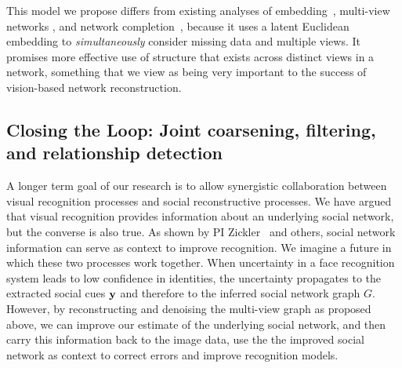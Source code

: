 This model we propose differs from existing analyses of embedding~\cite{Hoff01latentspace,Hancocklatent}, multi-view networks \cite{AiroldiBFX08,Kim12}, and network completion~\cite{Clauset,Guimera,HannekeX09,KimL11}, because it uses a latent Euclidean embedding to \emph{simultaneously} consider missing data and multiple views. It promises more effective use of structure that exists across distinct views in a network, something that we view as being very important to the success of vision-based network reconstruction. 


\subsection{Closing the Loop: Joint coarsening, filtering, and relationship detection}
\label{sec:closeloop}

A longer term goal of our research is to allow synergistic collaboration between visual recognition processes and social reconstructive processes. We have argued that visual recognition provides information about an underlying social network, but the converse is also true. As shown by PI Zickler~\cite{Stone2008,Stone2010} and others, social network information can serve as context to improve recognition. We imagine a future in which these two processes work together. When uncertainty in a face recognition system leads to low confidence in identities, the uncertainty propagates to the extracted social cues ${\bf y}$ and therefore to the inferred social network graph $G$. However, by reconstructing and denoising the multi-view graph as proposed above, we can improve our estimate of the underlying social network, and then carry this information back to the image data, use the the improved social network as context to correct  errors and improve recognition models.
